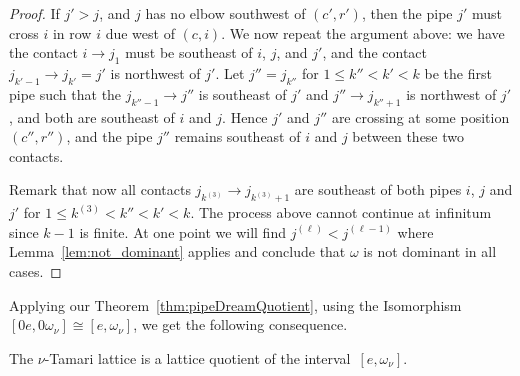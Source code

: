 \begin{proof}
If $j'>j$, and $j$ has no elbow southwest of $(c',r')$, then the pipe $j'$ must cross $i$ in row $i$ due west of $(c,i)$. We now repeat the argument above: we have the contact $i\to j_1$ must be southeast of $i$, $j$, and $j'$, and the contact $j_{k'-1}\to j_{k'}=j'$ is northwest of $j'$. Let $j''=j_{k''}$ for $1\le k''<k'<k$ be the first pipe such that the $j_{k''-1}\to j''$ is southeast of $j'$ and $j''\to j_{k''+1}$ is northwest of $j'$, and both are southeast of $i$ and $j$. Hence $j'$ and $j''$ are crossing at some position $(c'',r'')$, and the pipe $j''$ remains southeast of $i$ and $j$ between these two contacts.

Remark that now all contacts $j_{k^{(3)}}\to j_{k^{(3)}+1}$ are southeast of both pipes  $i$, $j$ and $j'$ for $1\le k^{(3)}<k'' <k' < k$.
The process above cannot continue at infinitum since $k-1$ is finite. At one point we will find $j^{(\ell)}<j^{(\ell-1)}$ where Lemma~\ref{lem:not_dominant} applies and conclude that $\omega$ is not dominant
in all cases. 
\end{proof}

Applying our Theorem~\ref{thm:pipeDreamQuotient}, using the Isomorphism $[0e,0\omega_\nu]\cong [e,\omega_\nu]$, we get the following consequence.

\begin{corollary}
The $\nu$-Tamari lattice is a lattice quotient of the interval~$[e,\omega_\nu]$.
\end{corollary}  
